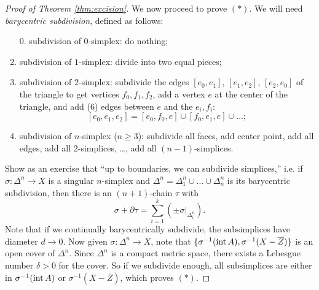 \begin{proof}[Proof of Theorem \ref{thm:excision}]
  We now proceed to prove $(*)$. We will need
  \emph{barycentric subdivision}, defined as follows:
  \begin{enumerate}
    \item[0.] subdivision of $0$-simplex: do nothing;
    \item subdivision of $1$-simplex: divide into two
      equal pieces;
    \item subdivision of $2$-simplex:
      subdivide the edges $[e_0, e_1]$, $[e_1, e_2]$,
      $[e_2, e_0]$ of the triangle to get
      vertices $f_0, f_1, f_2$, add a vertex $e$
      at the center of the triangle, and add (6) edges
      between $e$ and the $e_i, f_i$:
      \[
        [e_0, e_1, e_2]
        = [e_0, f_0, e] \cup [f_0, e_1, e] \cup \dots;
      \]
    \item subdivision of $n$-simplex ($n \ge 3$):
      subdivide all faces, add center point, add all
      edges, add all $2$-simplices, \dots, add
      all $(n - 1)$-simplices.
  \end{enumerate}
  Show as an exercise that ``up to boundaries, we can
  subdivide simplices,'' i.e. if $\sigma : \Delta^n \to X$
  is a singular $n$-simplex and
  $\Delta^n = \Delta_1^n \cup \dots \cup \Delta_n^n$
  is its barycentric subdivision, then
  there is an $(n + 1)$-chain $\tau$ with
  \[
    \sigma + \partial \tau = \sum_{i = 1}^k (\pm \sigma|_{\Delta_i^n}).
  \]
  Note that if we continually barycentrically subdivide,
  the subsimplices have diameter $d \to 0$.
  Now given $\sigma : \Delta^n \to X$, note that
  $\{\sigma^{-1}(\operatorname{int} A), \sigma^{-1}(X - \overline{Z})\}$
  is an open cover of $\Delta^n$. Since
  $\Delta^n$ is a compact metric space, there exists
  a Lebesgue number $\delta > 0$ for the cover.
  So if we subdivide enough, all subsimplices
  are either in $\sigma^{-1}(\operatorname{int} A)$ or $\sigma^{-1}(X - \overline{Z})$, which
  proves $(*)$.
\end{proof}
